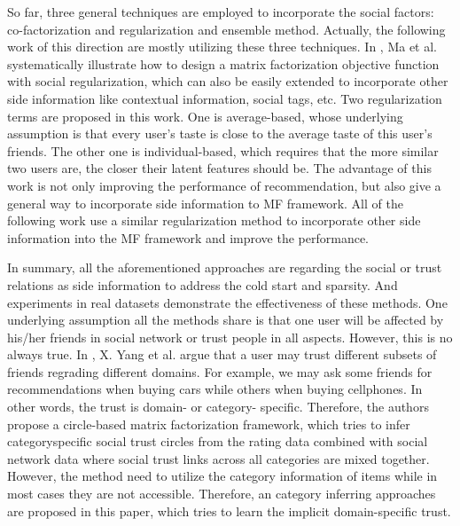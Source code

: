 So far, three general techniques are employed to incorporate the social factors: co-factorization \cite{ma2008sorec} and regularization \cite{ma2009learningTrust}\cite{jamali2010matrix} and ensemble method\cite{ma2009llearningEnsembel}. Actually, the following work of this direction are mostly utilizing these three techniques. In \cite{ma2011recommender}, Ma et al. systematically illustrate how to design a matrix factorization objective function with social regularization, which can also be easily extended to incorporate other side information like contextual information, social tags, etc. Two regularization terms are proposed in this work. One is average-based, whose underlying assumption is that every user's taste is close to the average taste of this user's friends. The other one is individual-based, which requires that the more similar two users are, the closer their latent features should be. The advantage of this work is not only improving the performance of recommendation, but also give a general way to incorporate side information to MF framework. All of the following work \cite{Forsati:2015:PER:2792838.2800198} \cite{li2015overlapping} \cite{yang2013social} use a similar regularization method to incorporate other side information into the MF framework and improve the performance.

In summary, all the aforementioned approaches are regarding the social or trust relations as side information to address the cold start and sparsity. And experiments in real datasets demonstrate the effectiveness of these methods. One underlying assumption all the methods share is that one user will be affected by his/her friends in social network or trust people in all aspects. However, this is no always true. In \cite{yang2012circle}, X. Yang et al. argue that a user may trust different subsets of friends regrading different domains. For example, we may ask some friends for recommendations when buying cars while others when buying cellphones. In other words, the trust is domain- or category- specific. Therefore, the authors propose a circle-based matrix factorization framework, which tries to infer category\-specific social trust circles from the rating data combined with social network data where social trust links across all categories are mixed together. However, the method need to utilize the category information of items while in most cases they are not accessible. Therefore, an category inferring approaches are proposed in this paper, which tries to learn the implicit domain-specific trust.

